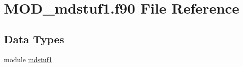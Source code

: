 \hypertarget{MOD__mdstuf1_8f90}{\section{M\-O\-D\-\_\-mdstuf1.\-f90 File Reference}
\label{MOD__mdstuf1_8f90}
}
\subsection*{Data Types}
\begin{DoxyCompactItemize}
\item 
module \hyperlink{classmdstuf1}{mdstuf1}
\end{DoxyCompactItemize}
